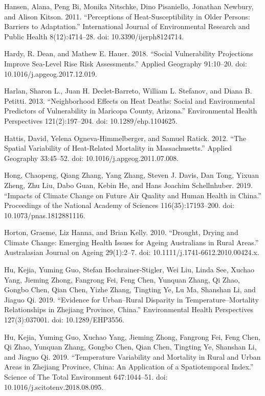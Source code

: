 \documentclass[12pt]{article}
\begin{document}
Hansen, Alana, Peng Bi, Monika Nitschke, Dino Pisaniello, Jonathan
Newbury, and Alison Kitson. 2011. ``Perceptions of Heat-Susceptibility
in Older Persons: Barriers to Adaptation.'' International Journal of
Environmental Research and Public Health 8(12):4714--28. doi:
10.3390/ijerph8124714.

Hardy, R. Dean, and Mathew E. Hauer. 2018. ``Social Vulnerability
Projections Improve Sea-Level Rise Risk Assessments.'' Applied Geography
91:10--20. doi: 10.1016/j.apgeog.2017.12.019.

Harlan, Sharon L., Juan H. Declet-Barreto, William L. Stefanov, and
Diana B. Petitti. 2013. ``Neighborhood Effects on Heat Deaths: Social
and Environmental Predictors of Vulnerability in Maricopa County,
Arizona.'' Environmental Health Perspectives 121(2):197--204. doi:
10.1289/ehp.1104625.

Hattis, David, Yelena Ogneva-Himmelberger, and Samuel Ratick. 2012.
``The Spatial Variability of Heat-Related Mortality in Massachusetts.''
Applied Geography 33:45--52. doi: 10.1016/j.apgeog.2011.07.008.

Hong, Chaopeng, Qiang Zhang, Yang Zhang, Steven J. Davis, Dan Tong,
Yixuan Zheng, Zhu Liu, Dabo Guan, Kebin He, and Hans Joachim
Schellnhuber. 2019. ``Impacts of Climate Change on Future Air Quality
and Human Health in China.'' Proceedings of the National Academy of
Sciences 116(35):17193--200. doi: 10.1073/pnas.1812881116.

Horton, Graeme, Liz Hanna, and Brian Kelly. 2010. ``Drought, Drying and
Climate Change: Emerging Health Issues for Ageing Australians in Rural
Areas.'' Australasian Journal on Ageing 29(1):2--7. doi:
10.1111/j.1741-6612.2010.00424.x.

Hu, Kejia, Yuming Guo, Stefan Hochrainer-Stigler, Wei Liu, Linda See,
Xuchao Yang, Jieming Zhong, Fangrong Fei, Feng Chen, Yunquan Zhang, Qi
Zhao, Gongbo Chen, Qian Chen, Yizhe Zhang, Tingting Ye, Lu Ma, Shanshan
Li, and Jiaguo Qi. 2019. ``Evidence for Urban--Rural Disparity in
Temperature--Mortality Relationships in Zhejiang Province, China.''
Environmental Health Perspectives 127(3):037001. doi: 10.1289/EHP3556.

Hu, Kejia, Yuming Guo, Xuchao Yang, Jieming Zhong, Fangrong Fei, Feng
Chen, Qi Zhao, Yunquan Zhang, Gongbo Chen, Qian Chen, Tingting Ye,
Shanshan Li, and Jiaguo Qi. 2019. ``Temperature Variability and
Mortality in Rural and Urban Areas in Zhejiang Province, China: An
Application of a Spatiotemporal Index.'' Science of The Total
Environment 647:1044--51. doi: 10.1016/j.scitotenv.2018.08.095.
\end{document}

